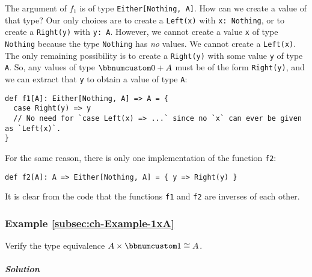 The argument of $f_{1}$ is of type \lstinline!Either[Nothing, A]!.
How can we create a value of that type? Our only choices are to create
a \lstinline!Left(x)! with \lstinline!x: Nothing!, or to create
a \lstinline!Right(y)! with \lstinline!y: A!. However, we cannot
create a value \lstinline!x! of type \lstinline!Nothing! because
the type \lstinline!Nothing! has \emph{no} values. We cannot create
a \lstinline!Left(x)!. The only remaining possibility is to create
a \lstinline!Right(y)! with some value \lstinline!y! of type \lstinline!A!.
So, any values of type $\bbnum 0+A$ must be of the form \lstinline!Right(y)!,
and we can extract that \lstinline!y! to obtain a value of type \lstinline!A!:
\begin{lstlisting}
def f1[A]: Either[Nothing, A] => A = {
  case Right(y) => y
  // No need for `case Left(x) => ...` since no `x` can ever be given as `Left(x)`.
}
\end{lstlisting}
For the same reason, there is only one implementation of the function
\lstinline!f2!:
\begin{lstlisting}
def f2[A]: A => Either[Nothing, A] = { y => Right(y) }
\end{lstlisting}
It is clear from the code that the functions \lstinline!f1! and \lstinline!f2!
are inverses of each other.

\subsubsection{Example \label{subsec:ch-Example-1xA}\ref{subsec:ch-Example-1xA}}

Verify the type equivalence $A\times\bbnum 1\cong A$.

\subparagraph{Solution}

